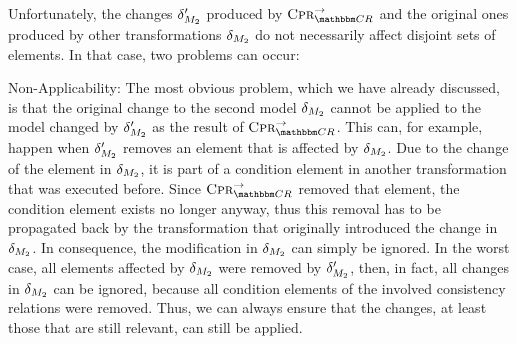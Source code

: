 Unfortunately, the changes $\delta_{M_{2}}'$ produced by $\consistencypreservationrule{\consistencyrelationset{CR}}^{\rightarrow}$ and the original ones produced by other transformations $\delta_{M_{2}}$ do not necessarily affect disjoint sets of elements.
In that case, two problems can occur:
\begin{properdescription}
    \item[Non-Applicability:] The most obvious problem, which we have already discussed, is that the original change to the second model $\delta_{M_{2}}$ cannot be applied to the model changed by $\delta_{M_{2}}'$ as the result of $\consistencypreservationrule{\consistencyrelationset{CR}}^{\rightarrow}$. 
    This can, for example, happen when $\delta_{M_{2}}'$ removes an element that is affected by $\delta_{M_{2}}$.
    Due to the change of the element in $\delta_{M_{2}}$, it is part of a condition element in another transformation that was executed before.
    Since $\consistencypreservationrule{\consistencyrelationset{CR}}^{\rightarrow}$ removed that element, the condition element exists no longer anyway, thus this removal has to be propagated back by the transformation that originally introduced the change in $\delta_{M_{2}}$.
    In consequence, the modification in $\delta_{M_{2}}$ can simply be ignored.
    In the worst case, all elements affected by $\delta_{M_{2}}$ were removed by $\delta_{M_{2}}'$, then, in fact, all changes in $\delta_{M_{2}}$ can be ignored, because all condition elements of the involved consistency relations were removed.
    Thus, we can always ensure that the changes, at least those that are still relevant, can still be applied.
    

\end{properdescription}
